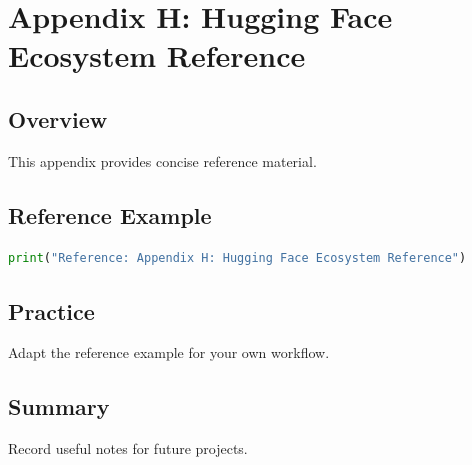 \chapter{Appendix H: Hugging Face Ecosystem Reference}
\label{chap:vol12-8}



\section{Overview}
This appendix provides concise reference material.

\section{Reference Example}
\begin{lstlisting}[language=Python]
print("Reference: Appendix H: Hugging Face Ecosystem Reference")
\end{lstlisting}

\section{Practice}
\begin{exercise}
Adapt the reference example for your own workflow.
\end{exercise}

\section{Summary}
Record useful notes for future projects.
